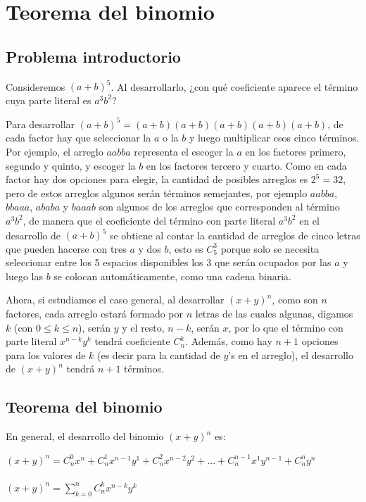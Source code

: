 \documentclass[12pt]{article}
\begin{document}
\section{Teorema del binomio}

\subsection{Problema introductorio}

Consideremos $(a+b)^5$. Al desarrollarlo, ¿con qué coeficiente aparece el término cuya parte literal es $a^3b^2$?

Para desarrollar $(a+b)^5= (a+b)(a+b)(a+b)(a+b)(a+b)$, de cada factor hay que seleccionar la $a$ o la $b$ y luego multiplicar esos cinco términos. Por ejemplo, el arreglo $aabba$ representa el escoger la $a$ en los factores primero, segundo y quinto, y escoger la $b$ en los factores tercero y cuarto. Como en cada factor hay dos opciones para elegir, la cantidad de posibles arreglos es $2^5= 32$, pero de estos arreglos algunos serán términos semejantes, por ejemplo $aabba$, $bbaaa$, $ababa$ y $baaab$ son algunos de los arreglos que corresponden al término $a^3b^2$, de manera que el coeficiente del término con parte literal $a^3b^2$ en el desarrollo de $(a+b)^5$ se obtiene al contar la cantidad de arreglos de cinco letras que pueden hacerse con tres $a$ y dos $b$, esto es $C^{3}_{5}$ porque solo se necesita seleccionar entre los 5 espacios disponibles los 3 que serán ocupados por las $a$ y luego las $b$ se colocan automáticamente, como una cadena binaria.

Ahora, si estudiamos el caso general, al desarrollar $(x+y)^n$, como son $n$ factores, cada arreglo estará formado por $n$ letras de las cuales algunas, digamos $k$ (con $0 \leq k \leq n$), serán $y$ y el resto, $n-k$, serán $x$, por lo que el término con parte literal $x^{n-k} y^k$ tendrá coeficiente $C^{k}_{n}$. Además, como hay $n+1$ opciones para los valores de $k$ (es decir para la cantidad de $y$’s en el arreglo), el desarrollo de $(x+y)^n$ tendrá $n+1$ términos. 

\subsection{Teorema del binomio}

En general, el desarrollo del binomio $(x+y)^n$ es:

\begin{center}
    $(x+y)^n= C^{0}_{n} x^{n} + C^{1}_{n} x^{n-1} y^{1} + C^{2}_{n} x^{n-2} y^{2} + ... + C^{n-1}_{n} x^{1} y^{n-1} + C^{n}_{n} y^{n}$ \\ \hfill \\
    $(x+y)^n= \displaystyle\sum_{k=0}^{n} C^{k}_{n} x^{n-k} y^{k}$
\end{center}
\end{document}
